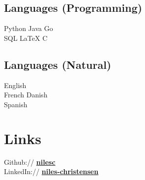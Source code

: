 \documentclass[letterpaper]{deedy-resume} %
\begin{document}
\begin{minipage}[t]{0.33\textwidth}
\subsection{Languages (Programming)}
Python \textbullet{} Java \textbullet{} Go \\
SQL \textbullet{} LaTeX \textbullet{} C \\
\sectionspace
\subsection{Languages (Natural)}
English\\
French \textbullet{} Danish\\
Spanish\\


\sectionspace %


\section{Links}

Github:// \href{https://github.com/nilesc}{\bf nilesc} \\
LinkedIn:// \href{https://www.linkedin.com/in/niles-christensen}{\bf niles-christensen} \\

\sectionspace %


\end{minipage}
\end{document}
